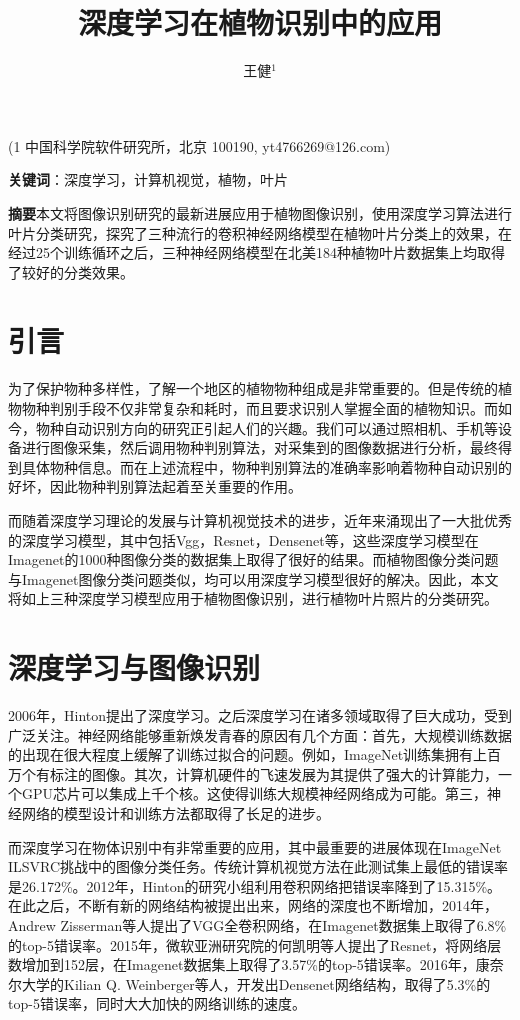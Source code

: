 \documentclass[a4paper]{ctexart} %
\title{深度学习在植物识别中的应用}
\author{王健$^1$}
\begin{document}
	\maketitle
	\begin{center}
		(1 中国科学院软件研究所，北京 100190, yt4766269@126.com)
	\end{center}
\textbf{关键词}：深度学习，计算机视觉，植物，叶片

\textbf{摘要}\quad 本文将图像识别研究的最新进展应用于植物图像识别，使用深度学习算法进行叶片分类研究，探究了三种流行的卷积神经网络模型在植物叶片分类上的效果，在经过25个训练循环之后，三种神经网络模型在北美184种植物叶片数据集上均取得了较好的分类效果。

\section*{引言}
为了保护物种多样性，了解一个地区的植物物种组成是非常重要的。但是传统的植物物种判别手段不仅非常复杂和耗时，而且要求识别人掌握全面的植物知识。而如今，物种自动识别方向的研究正引起人们的兴趣。我们可以通过照相机、手机等设备进行图像采集，然后调用物种判别算法，对采集到的图像数据进行分析，最终得到具体物种信息。而在上述流程中，物种判别算法的准确率影响着物种自动识别的好坏，因此物种判别算法起着至关重要的作用。

而随着深度学习理论的发展与计算机视觉技术的进步，近年来涌现出了一大批优秀的深度学习模型，其中包括Vgg\parencite{vgg}，Resnet\parencite{resnet}，Densenet\parencite{densenet}等，这些深度学习模型在Imagenet\parencite{imagenet}的1000种图像分类的数据集上取得了很好的结果。而植物图像分类问题与Imagenet图像分类问题类似，均可以用深度学习模型很好的解决。因此，本文将如上三种深度学习模型应用于植物图像识别，进行植物叶片照片的分类研究。

\section*{深度学习与图像识别}
2006年，Hinton提出了深度学习。之后深度学习在诸多领域取得了巨大成功，受到广泛关注。神经网络能够重新焕发青春的原因有几个方面：首先，大规模训练数据的出现在很大程度上缓解了训练过拟合的问题。例如，ImageNet训练集拥有上百万个有标注的图像。其次，计算机硬件的飞速发展为其提供了强大的计算能力，一个GPU芯片可以集成上千个核。这使得训练大规模神经网络成为可能。第三，神经网络的模型设计和训练方法都取得了长足的进步。

而深度学习在物体识别中有非常重要的应用，其中最重要的进展体现在ImageNet ILSVRC挑战中的图像分类任务。传统计算机视觉方法在此测试集上最低的错误率是26.172\%。2012年，Hinton的研究小组利用卷积网络把错误率降到了15.315\%。在此之后，不断有新的网络结构被提出出来，网络的深度也不断增加，2014年，Andrew Zisserman等人提出了VGG全卷积网络，在Imagenet数据集上取得了6.8\%的top-5错误率。2015年，微软亚洲研究院的何凯明等人提出了Resnet，将网络层数增加到152层，在Imagenet数据集上取得了3.57\%的top-5错误率。2016年，康奈尔大学的Kilian Q. Weinberger等人，开发出Densenet网络结构，取得了5.3\%的top-5错误率，同时大大加快的网络训练的速度。
\end{document}

